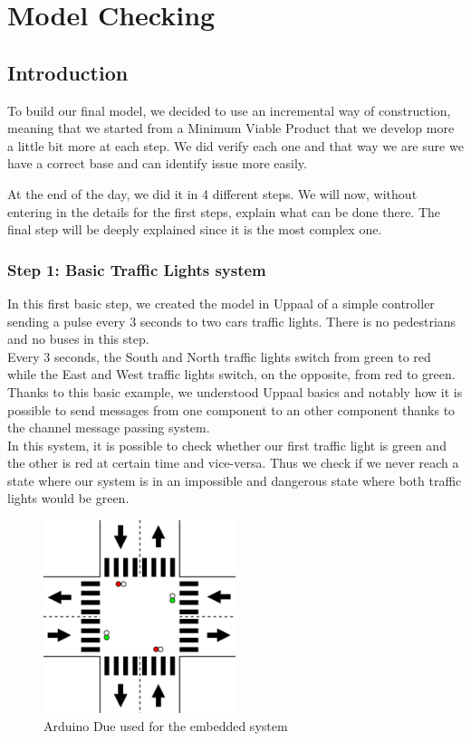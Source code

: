 \section{Model Checking}
\subsection{Introduction}
To build our final model, we decided to use an incremental way of construction, meaning that we started from a Minimum Viable Product that we develop more a little bit more at each step. We did verify each one and that way we are sure we have a correct base and can identify issue more easily.

At the end of the day, we did it in 4 different steps. We will now, without entering in the details for the first steps, explain what can be done there. The final step will be deeply explained since it is the most complex one.

\subsubsection{Step 1: Basic Traffic Lights system}
In this first basic step, we created the model in Uppaal of a simple controller sending a pulse every 3 seconds to two cars traffic lights. There is no pedestrians and no buses in this step. \\
Every 3 seconds, the South and North traffic lights switch from green to red while the East and West traffic lights switch, on the opposite, from red to green. \\

Thanks to this basic example, we understood Uppaal basics and notably how it is possible to send messages from one component to an other component thanks to the channel message passing system. \\

In this system, it is possible to check whether our first traffic light is green and the other is red at certain time and vice-versa. Thus we check if we never reach a state where our system is in an impossible and dangerous state where both traffic lights would be green.


\begin{figure}[!ht]\label{fig:arduino}
  \centering
    \includegraphics[width=0.5\textwidth]{picture/model/trafficlight_step1_s1.png}
    \caption{Arduino Due used for the embedded system}
\end{figure}

